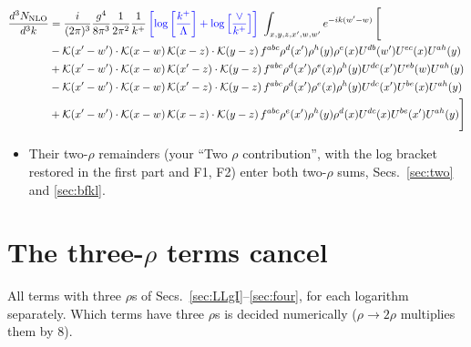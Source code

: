 \documentclass[10pt]{article}
\numberwithin{equation}{section}
\begin{document}
\begin{align}
      \frac{d^{3}N_{\rm NLO}}{d^{3}k} & = \frac{i}{(2\pi)^{3}}\frac{g^{4}}{8\pi^{3}}\frac{1}{2\pi^{2}} \frac{1}{k^{+}}\,{\color{blue}\left[\log{\left[\frac{k^{+}}{\Lambda}\right]}+\log{\left[\frac{\vee}{k^{+}}\right]}\right]}\,\,\int_{x,y,z,x^{\prime},w,w^{\prime}}e^{-ik(w^{\prime}-w)}\, \Bigg[\notag \\ & - \mathcal{K}(x'-w')\cdot \mathcal{K}(x-w)\, \mathcal{K}(x-z)\cdot \mathcal{K}(y-z)\, f^{a b c} \rho^{d}(x') \rho^{h}(y) \rho^{e}(x) U^{d b}(w') U^{e c}(x) U^{a h}(y)\nonumber\\
    &+ \mathcal{K}(x'-w')\cdot \mathcal{K}(x-w)\,\mathcal{K}(x'-z)\cdot \mathcal{K}(y-z)\, f^{a b c} \rho^{d}(x') \rho^{e}(x) \rho^{h}(y) U^{d c}(x') U^{e b}(w) U^{a h}(y)\nonumber\\
    &- \mathcal{K}(x'-w')\cdot \mathcal{K}(x-w)\,\mathcal{K}(x'-z)\cdot \mathcal{K}(y-z)\, f^{a b c} \rho^{d}(x') \rho^{e}(x) \rho^{h}(y) U^{d c}(x') U^{b e}(x) U^{a h}(y)\nonumber\\
    &+  \mathcal{K}(x'-w')\cdot \mathcal{K}(x-w)\, \mathcal{K}(x-z)\cdot \mathcal{K}(y-z)\, f^{a b c} \rho^{e}(x') \rho^{h}(y) \rho^{d}(x) U^{d c}(x) U^{b e}(x') U^{a h}(y) \Bigg]
\label{eq:fourb}
\end{align}
\begin{itemize}
\item Their two-$\rho$ remainders (your ``Two $\rho$ contribution'', with the log bracket restored in the first part and F1, F2) enter both two-$\rho$ sums, Secs.~\ref{sec:two} and \ref{sec:bfkl}.
\end{itemize}

\section{The three-\texorpdfstring{$\rho$}{rho} terms cancel}\label{sec:three}
All terms with three $\rho$\textquotesingle s of Secs.~\ref{sec:LLgI}--\ref{sec:four}, for each logarithm separately. Which terms have three $\rho$\textquotesingle s is decided numerically ($\rho\to2\rho$ multiplies them by 8).
\end{document}

